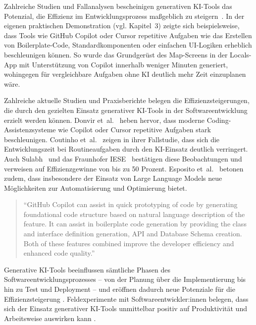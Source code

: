 Zahlreiche Studien und Fallanalysen bescheinigen generativen KI-Tools das
Potenzial, die Effizienz im Entwicklungsprozess maßgeblich zu
steigern~\cite{donvir_role_2024,coutinho_role_2024,s_future_2024,esposito_generative_2025,braun_ki_2024,siebert_generative_2024}.
In der eigenen praktischen Demonstration (vgl. Kapitel~3) zeigte sich
beispielsweise, dass Tools wie GitHub Copilot oder Cursor repetitive Aufgaben
wie das Erstellen von Boilerplate-Code, Standardkomponenten oder einfachen
UI-Logiken erheblich beschleunigen können. So wurde das Grundgerüst des
Map-Screens in der Locals-App mit Unterstützung von Copilot innerhalb weniger
Minuten generiert, wohingegen für vergleichbare Aufgaben ohne KI deutlich mehr
Zeit einzuplanen wäre.

Zahlreiche aktuelle Studien und Praxisberichte belegen die
Effizienzsteigerungen, die durch den gezielten Einsatz generativer KI-Tools in
der Softwareentwicklung erzielt werden können. Donvir
et~al.~\cite{donvir_role_2024} heben hervor, dass moderne
Coding-Assistenzsysteme wie Copilot oder Cursor repetitive Aufgaben stark
beschleunigen. Coutinho et~al.~\cite{coutinho_role_2024} zeigen in ihrer
Fallstudie, dass sich die Entwicklungszeit bei Routineaufgaben durch den
KI-Einsatz deutlich verringert. Auch Sulabh~\cite{s_future_2024} und das
Fraunhofer IESE~\cite{siebert_generative_2024} bestätigen diese Beobachtungen
und verweisen auf Effizienzgewinne von bis zu 50 Prozent. Esposito
et~al.~\cite{esposito_generative_2025} betonen zudem, dass insbesondere der
Einsatz von Large Language Models neue Möglichkeiten zur Automatisierung und
Optimierung bietet.

\begin{quote}
    \enquote{GitHub Copilot can assist in quick prototyping of code by generating foundational code structure based on natural language description of the feature. It can assist in boilerplate code generation by providing the class and interface definition generation, API and Database Schema creation. Both of these features combined improve the developer efficiency and enhanced code quality.}
    \cite[S.~8]{donvir_role_2024}
\end{quote}

Generative KI-Tools beeinflussen sämtliche Phasen des
Softwareentwicklungsprozesses – von der Planung über die Implementierung bis
hin zu Test und Deployment – und eröffnen dadurch neue Potenziale für die
Effizienzsteigerung \cite{minikiewicz_impact_nodate}. Feldexperimente mit
Softwareentwickler:innen belegen, dass sich der Einsatz generativer KI-Tools
unmittelbar positiv auf Produktivität und Arbeitsweise auswirken kann
\cite{cui_effects_2024}.

